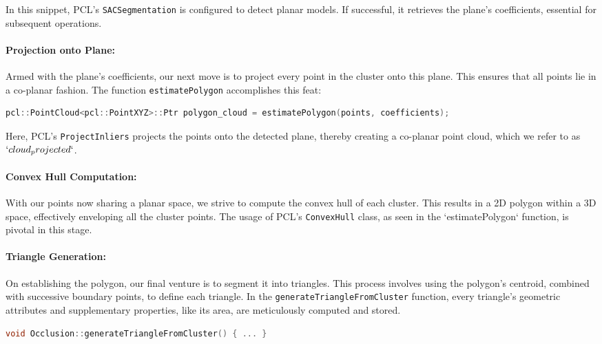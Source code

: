 \documentclass[11pt, a4paper,oneside,chapterprefix=false]{scrbook}
\begin{document}
In this snippet, PCL's \texttt{SACSegmentation} is configured to detect planar models. If successful, it retrieves the plane's coefficients, essential for subsequent operations.

\paragraph{Projection onto Plane:} Armed with the plane's coefficients, our next move is to project every point in the cluster onto this plane. This ensures that all points lie in a co-planar fashion. The function \texttt{estimatePolygon} accomplishes this feat:

\begin{lstlisting}[language=C++, caption=Projecting Points onto Plane]
pcl::PointCloud<pcl::PointXYZ>::Ptr polygon_cloud = estimatePolygon(points, coefficients);
\end{lstlisting}

Here, PCL's \texttt{ProjectInliers} projects the points onto the detected plane, thereby creating a co-planar point cloud, which we refer to as $`cloud_projected`$.

\paragraph{Convex Hull Computation:} With our points now sharing a planar space, we strive to compute the convex hull of each cluster. This results in a 2D polygon within a 3D space, effectively enveloping all the cluster points. The usage of PCL's \texttt{ConvexHull} class, as seen in the `estimatePolygon` function, is pivotal in this stage.

\paragraph{Triangle Generation:} On establishing the polygon, our final venture is to segment it into triangles. This process involves using the polygon's centroid, combined with successive boundary points, to define each triangle. In the \texttt{generateTriangleFromCluster} function, every triangle's geometric attributes and supplementary properties, like its area, are meticulously computed and stored.

\begin{lstlisting}[language=C++, caption=Triangle Generation from Polygons]
void Occlusion::generateTriangleFromCluster() { ... }
\end{lstlisting}
\end{document}
